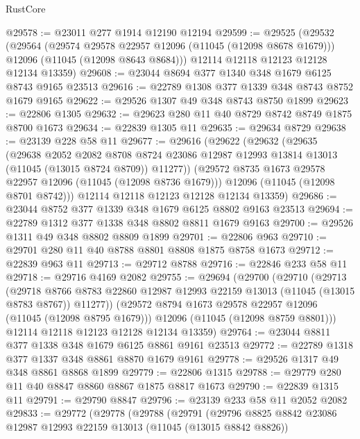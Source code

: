 \begin{lexlean}{RustCore}
\begin{coremodule}
@29578 := @23011 @277 @1914 @12190 @12194
@29599 := @29525
    (@29532
      (@29564
        (@29574 @29578 @22957 @12096 (@11045 (@12098 @8678 @1679)))
        @12096
        (@11045 (@12098 @8643 @8684)))
      @12114
      @12118
      @12123
      @12128
      @12134
      @13359)
@29608 := @23044 @8694 @377 @1340 @348 @1679 @6125 @8743 @9165 @23513
@29616 := @22789 @1308 @377 @1339 @348 @8743 @8752 @1679 @9165
@29622 := @29526 @1307 @49 @348 @8743 @8750 @1899
@29623 := @22806 @1305
@29632 := @29623 @280 @11 @40 @8729 @8742 @8749 @1875 @8700 @1673
@29634 := @22839 @1305 @11
@29635 := @29634 @8729
@29638 := @23139 @228 @58 @11
@29677 := @29616
    (@29622
      (@29632
        (@29635
          (@29638
            @2052
            @2082
            @8708
            @8724
            @23086
            @12987
            @12993
            @13814
            @13013
            (@11045 (@13015 @8724 @8709))
            @11277))
        (@29572 @8735 @1673 @29578 @22957 @12096 (@11045 (@12098 @8736 @1679)))
        @12096
        (@11045 (@12098 @8701 @8742)))
      @12114
      @12118
      @12123
      @12128
      @12134
      @13359)
@29686 := @23044 @8752 @377 @1339 @348 @1679 @6125 @8802 @9163 @23513
@29694 := @22789 @1312 @377 @1338 @348 @8802 @8811 @1679 @9163
@29700 := @29526 @1311 @49 @348 @8802 @8809 @1899
@29701 := @22806 @963
@29710 := @29701 @280 @11 @40 @8788 @8801 @8808 @1875 @8758 @1673
@29712 := @22839 @963 @11
@29713 := @29712 @8788
@29716 := @22846 @233 @58 @11
@29718 := @29716 @4169 @2082
@29755 := @29694
    (@29700
      (@29710
        (@29713
          (@29718
            @8766
            @8783
            @22860
            @12987
            @12993
            @22159
            @13013
            (@11045 (@13015 @8783 @8767))
            @11277))
        (@29572 @8794 @1673 @29578 @22957 @12096 (@11045 (@12098 @8795 @1679)))
        @12096
        (@11045 (@12098 @8759 @8801)))
      @12114
      @12118
      @12123
      @12128
      @12134
      @13359)
@29764 := @23044 @8811 @377 @1338 @348 @1679 @6125 @8861 @9161 @23513
@29772 := @22789 @1318 @377 @1337 @348 @8861 @8870 @1679 @9161
@29778 := @29526 @1317 @49 @348 @8861 @8868 @1899
@29779 := @22806 @1315
@29788 := @29779 @280 @11 @40 @8847 @8860 @8867 @1875 @8817 @1673
@29790 := @22839 @1315 @11
@29791 := @29790 @8847
@29796 := @23139 @233 @58 @11 @2052 @2082
@29833 := @29772
    (@29778
      (@29788
        (@29791
          (@29796
            @8825
            @8842
            @23086
            @12987
            @12993
            @22159
            @13013
            (@11045 (@13015 @8842 @8826))

\end{coremodule}
\end{lexlean}
